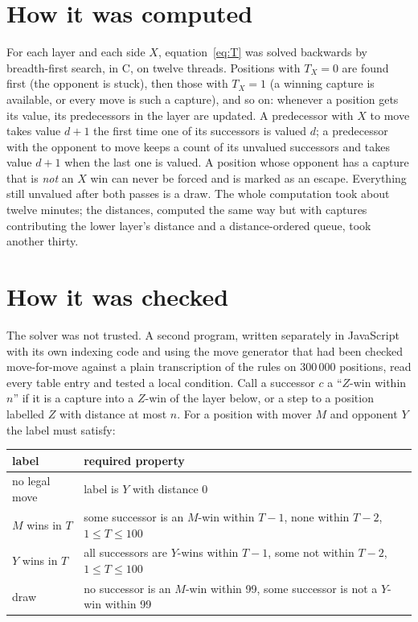 \documentclass[11pt,a4paper]{article}
\begin{document}
\section*{How it was computed}

For each layer and each side $X$, equation~\eqref{eq:T} was solved backwards by
breadth-first search, in C, on twelve threads. Positions with $T_X=0$ are found
first (the opponent is stuck), then those with $T_X=1$ (a winning capture is
available, or every move is such a capture), and so on: whenever a position gets
its value, its predecessors in the layer are updated. A predecessor with $X$ to
move takes value $d+1$ the first time one of its successors is valued $d$; a
predecessor with the opponent to move keeps a count of its unvalued successors and
takes value $d+1$ when the last one is valued. A position whose opponent has a
capture that is \emph{not} an $X$ win can never be forced and is marked as an
escape. Everything still unvalued after both passes is a draw. The whole
computation took about twelve minutes; the distances, computed the same way but
with captures contributing the lower layer's distance and a distance-ordered
queue, took another thirty.

\section*{How it was checked}

The solver was not trusted. A second program, written separately in JavaScript
with its own indexing code and using the move generator that had been checked
move-for-move against a plain transcription of the rules on 300\,000 positions,
read every table entry and tested a local condition. Call a successor $c$ a
``$Z$-win within $n$'' if it is a capture into a $Z$-win of the layer below, or a
step to a position labelled $Z$ with distance at most $n$. For a position with
mover $M$ and opponent $Y$ the label must satisfy:

\begin{center}
\begin{tabular}{@{}ll@{}}
\toprule
label & required property \\
\midrule
no legal move & label is $Y$ with distance 0 \\
$M$ wins in $T$ & some successor is an $M$-win within $T-1$, none within $T-2$, $1\le T\le100$ \\
$Y$ wins in $T$ & all successors are $Y$-wins within $T-1$, some not within $T-2$, $1\le T\le100$ \\
draw & no successor is an $M$-win within 99, some successor is not a $Y$-win within 99 \\
\bottomrule
\end{tabular}
\end{center}
\end{document}
